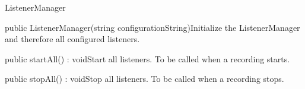 \begin{class}{ListenerManager}


\begin{constructors}
\begin{constructor}{public ListenerManager(string configurationString)}{Initialize the ListenerManager and therefore all configured listeners.}
\begin{parameters}
\end{parameters}
\end{constructor}
\end{constructors}
\begin{methods}
\begin{method}{public startAll() : void}{Start all listeners. To be called when a recording starts.}
\end{method}
\begin{method}{public stopAll() : void}{Stop all listeners. To be called when a recording stops.}
\end{method}
\end{methods}
\end{class}

